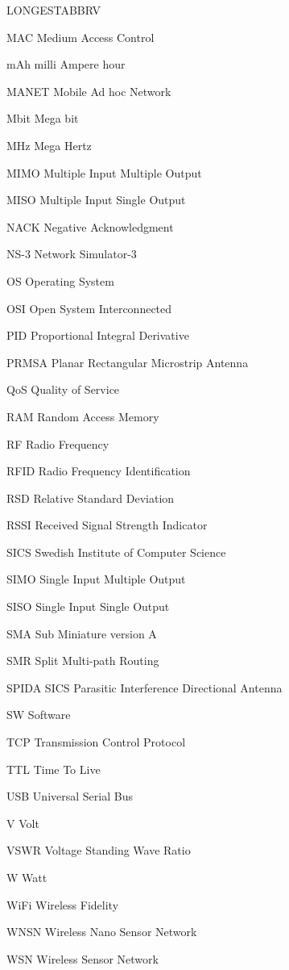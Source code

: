 \begin{theglossary}{LONGESTABBRV}
\item[MAC] Medium Access Control
\item[mAh] milli Ampere hour
\item[MANET] Mobile Ad hoc Network
\item[Mbit] Mega bit
\item[MHz] Mega Hertz
\item[MIMO] Multiple Input Multiple Output
\item[MISO] Multiple Input Single Output
\item[NACK] Negative Acknowledgment
\item[NS-3] Network Simulator-3
\item[OS] Operating System
\item[OSI] Open System Interconnected
\item[PID] Proportional Integral Derivative
\item[PRMSA] Planar Rectangular Microstrip Antenna
\item[QoS] Quality of Service
\item[RAM] Random Access Memory
\item[RF] Radio Frequency
\item[RFID] Radio Frequency Identification
\item[RSD] Relative Standard Deviation
\item[RSSI] Received Signal Strength Indicator
\item[SICS] Swedish Institute of Computer Science
\item[SIMO] Single Input Multiple Output
\item[SISO] Single Input Single Output
\item[SMA] Sub Miniature version A
\item[SMR] Split Multi-path Routing
\item[SPIDA] SICS Parasitic Interference Directional Antenna
\item[SW] Software
\item[TCP] Transmission Control Protocol
\item[TTL] Time To Live
\item[USB] Universal Serial Bus
\item[V] Volt
\item[VSWR] Voltage Standing Wave Ratio
\item[W] Watt
\item[WiFi] Wireless Fidelity
\item[WNSN] Wireless Nano Sensor Network
\item[WSN] Wireless Sensor Network
\end{theglossary}
